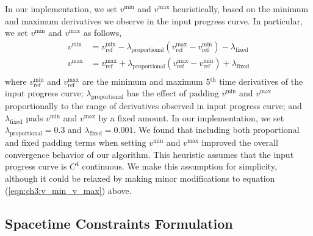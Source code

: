 In our implementation, we set $v^{\text{min}}$ and $v^{\text{max}}$ heuristically, based on the minimum and maximum derivatives we observe in the input progress curve.
In particular, we set $v^{\text{min}}$ and $v^{\text{max}}$ as follows,
%
\begin{equation}
\begin{aligned}
%
v^{\text{min}} & = v^{\text{min}}_{\text{ref}} - \lambda_{\text{proportional}} ( v^{\text{max}}_{\text{ref}} - v^{\text{min}}_{\text{ref}} ) - \lambda_{\text{fixed}} \\
v^{\text{max}} & = v^{\text{max}}_{\text{ref}} + \lambda_{\text{proportional}} ( v^{\text{max}}_{\text{ref}} - v^{\text{min}}_{\text{ref}} ) + \lambda_{\text{fixed}} \\
%
\end{aligned}
\label{eqn:ch3:v_min_v_max}
\end{equation}
%
where $v^{\text{min}}_{\text{ref}}$ and $v^{\text{max}}_{\text{ref}}$ are the minimum and maximum 5$^\text{th}$ time derivatives of the input progress curve;
$\lambda_{\text{proportional}}$ has the effect of padding $v^{\text{min}}$ and $v^{\text{max}}$ proportionally to the range of derivatives observed in input progress curve;
and $\lambda_{\text{fixed}}$ pads $v^{\text{min}}$ and $v^{\text{max}}$ by a fixed amount.
In our implementation, we set $\lambda_{\text{proportional}} = 0.3$ and $\lambda_{\text{fixed}} = 0.001$.
We found that including both proportional and fixed padding terms when setting $v^{\text{min}}$ and $v^{\text{max}}$ improved the overall convergence behavior of our algorithm.
This heuristic assumes that the input progress curve is $C^4$ continuous.
We make this assumption for simplicity, although it could be relaxed by making minor modifications to equation (\ref{eqn:ch3:v_min_v_max}) above.

\subsection{Spacetime Constraints Formulation}
\label{sec:ch3:spacetime}

